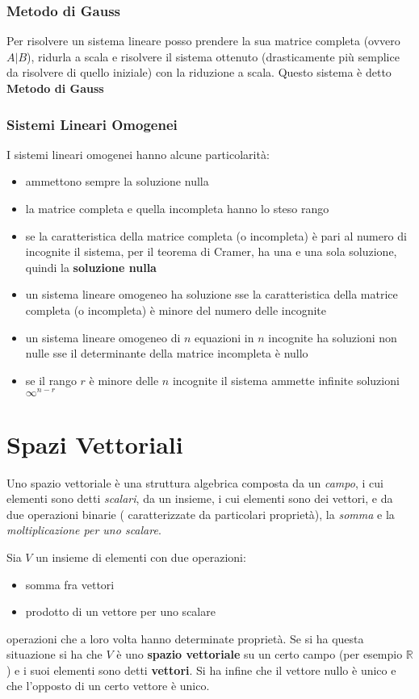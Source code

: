 \documentclass[a4paper,12pt, oneside]{book}
\begin{document}
\subsection{Metodo di Gauss}
Per risolvere un sistema lineare posso prendere la sua matrice completa (ovvero $A|B$), 	ridurla a scala e risolvere il sistema ottenuto (drasticamente più semplice da risolvere di quello iniziale) con la riduzione a scala. Questo sistema è detto \textbf{Metodo di Gauss}
\subsection{Sistemi Lineari Omogenei}
I sistemi lineari omogenei hanno alcune particolarità:
\begin{itemize}
	\item ammettono sempre la soluzione nulla
	\item la matrice completa e quella incompleta hanno lo steso rango
	\item se la caratteristica della matrice completa (o incompleta) è pari al numero di incognite il sistema, per il teorema di Cramer, ha una e una sola soluzione, quindi la \textbf{soluzione nulla}
	\item un sistema lineare omogeneo ha soluzione sse la caratteristica della matrice completa (o incompleta) è minore del numero delle incognite
	\item un sistema lineare omogeneo di $n$ equazioni in $n$ incognite ha soluzioni non nulle sse il determinante della matrice incompleta è nullo
	\item se il rango $r$ è minore delle $n$ incognite il sistema ammette infinite soluzioni $\infty^{n-r}$
\end{itemize}
\chapter{Spazi Vettoriali}
Uno spazio  vettoriale è una struttura algebrica composta da un \textit{campo}, i cui elementi sono detti \textit{scalari}, da un insieme, i cui elementi sono dei vettori, e da due operazioni binarie ( caratterizzate da particolari proprietà), la \textit{somma} e la \textit{moltiplicazione per uno scalare}.
\begin{definizione}
	Sia $V$ un insieme di elementi con due operazioni:
	\begin{itemize}
		\item somma fra vettori
		\item prodotto di un vettore per uno scalare
	\end{itemize}
	operazioni che a loro volta hanno determinate proprietà. Se si ha questa situazione si ha che $V$ è uno \textbf{spazio vettoriale} su un certo campo (per esempio $\mathbb{R}$) e i suoi elementi sono detti \textbf{vettori}. Si ha infine che il vettore nullo è unico e che l'opposto di un certo vettore è unico.
\end{definizione}
\end{document}
